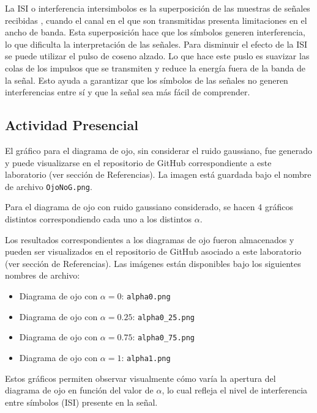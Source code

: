 \documentclass[lettersize,journal]{IEEEtran}
\begin{document}
La ISI o interferencia intersimbolos es la superposición de las muestras de señales recibidas , cuando el canal en el que son transmitidas presenta limitaciones en el ancho de banda. Esta superposición hace que los símbolos generen interferencia, lo que dificulta la interpretación de las señales.
Para disminuir el efecto de la ISI se puede utilizar el pulso de coseno alzado. Lo que hace este puslo es suavizar las colas de los impulsos que se transmiten y reduce la energía fuera de la banda de la señal. Esto ayuda a garantizar que los símbolos de las señales no generen interferencias entre sí y que la señal sea más fácil de comprender.

\subsection{Actividad Presencial}
El gráfico para el diagrama de ojo, sin considerar el ruido gaussiano, fue generado y puede visualizarse en el repositorio de GitHub correspondiente a este laboratorio (ver sección de Referencias). La imagen está guardada bajo el nombre de archivo \texttt{OjoNoG.png}.

Para el diagrama de ojo con ruido gaussiano considerado, se hacen 4 gráficos distintos correspondiendo cada uno a los distintos $\alpha$.

Los resultados correspondientes a los diagramas de ojo fueron almacenados y pueden ser visualizados en el repositorio de GitHub asociado a este laboratorio (ver sección de Referencias). Las imágenes están disponibles bajo los siguientes nombres de archivo:

\begin{itemize}
    \item Diagrama de ojo con $\alpha = 0$: \texttt{alpha0.png}
    \item Diagrama de ojo con $\alpha = 0.25$: \texttt{alpha0\_25.png}
    \item Diagrama de ojo con $\alpha = 0.75$: \texttt{alpha0\_75.png}
    \item Diagrama de ojo con $\alpha = 1$: \texttt{alpha1.png}
\end{itemize}

Estos gráficos permiten observar visualmente cómo varía la apertura del diagrama de ojo en función del valor de $\alpha$, lo cual refleja el nivel de interferencia entre símbolos (ISI) presente en la señal.
\end{document}
